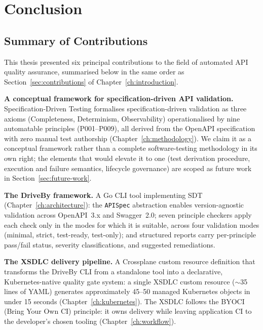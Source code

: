 \chapter{Conclusion}
\label{ch:conclusion}

\section{Summary of Contributions}
\label{sec:contributions-summary}

This thesis presented six principal contributions to the field of automated API quality assurance, summarised below in the same order as Section~\ref{sec:contributions} of Chapter~\ref{ch:introduction}.

\textbf{A conceptual framework for specification-driven API validation.} Specification-Driven Testing formalises specification-driven validation as three axioms (Completeness, Determinism, Observability) operationalised by nine automatable principles (P001--P009), all derived from the OpenAPI specification with zero manual test authorship (Chapter~\ref{ch:methodology}). We claim it as a conceptual framework rather than a complete software-testing methodology in its own right; the elements that would elevate it to one (test derivation procedure, execution and failure semantics, lifecycle governance) are scoped as future work in Section~\ref{sec:future-work}.

\textbf{The DriveBy framework.} A Go CLI tool implementing SDT (Chapter~\ref{ch:architecture}): the \texttt{APISpec} abstraction enables version-agnostic validation across OpenAPI~3.x and Swagger~2.0; seven principle checkers apply each check only in the modes for which it is suitable, across four validation modes (minimal, strict, test-ready, test-only); and structured reports carry per-principle pass/fail status, severity classifications, and suggested remediations.

\textbf{The XSDLC delivery pipeline.} A Crossplane custom resource definition that transforms the DriveBy CLI from a standalone tool into a declarative, Kubernetes-native quality gate system: a single XSDLC custom resource (\(\sim\)35 lines of YAML) generates approximately 45--50 managed Kubernetes objects in under 15 seconds (Chapter~\ref{ch:kubernetes}). The XSDLC follows the BYOCI (Bring Your Own CI) principle: it owns delivery while leaving application CI to the developer's chosen tooling (Chapter~\ref{ch:workflow}).

